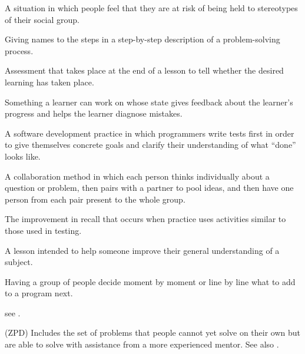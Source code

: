 \begin{description}
 A situation in which people feel
that they are at risk of being held to stereotypes of their social group.

 Giving names to the steps in a
step-by-step description of a problem-solving process.

 Assessment that takes
place at the end of a lesson to tell whether the desired learning has taken
place.

 Something a learner can work on
whose state gives feedback about the learner's progress and helps the learner
diagnose mistakes.

 A software
development practice in which programmers write tests first in order to give
themselves concrete goals and clarify their understanding of what ``done'' looks
like.

 A collaboration method in which
each person thinks individually about a question or problem, then pairs with a
partner to pool ideas, and then have one person from each pair present to the
whole group.

 The
improvement in recall that occurs when practice uses activities similar to those
used in testing.

 A lesson intended to help someone improve their
general understanding of a subject.

 Having a group of people decide moment
by moment or line by line what to add to a program next.

 see .

 (ZPD) Includes the set of problems that
people cannot yet solve on their own but are able to solve with assistance from
a more experienced mentor.  See also .

\end{description}

